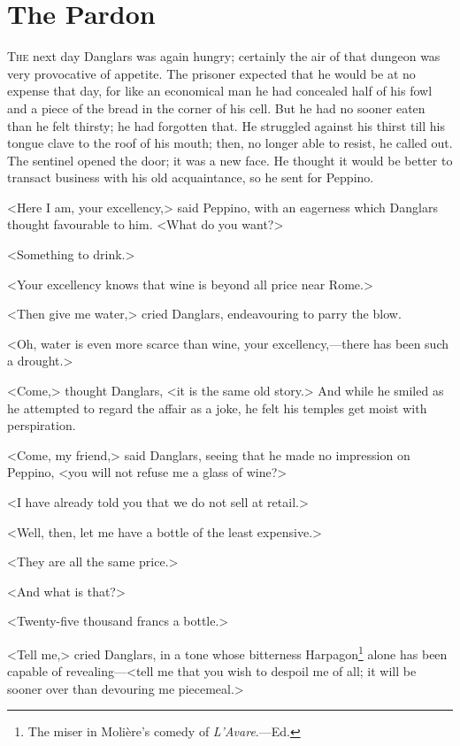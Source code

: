 \chapter{The Pardon} 

 \lettrine{T}{he} next day Danglars was again hungry; certainly the air of that dungeon was very provocative of appetite. The prisoner expected that he would be at no expense that day, for like an economical man he had concealed half of his fowl and a piece of the bread in the corner of his cell. But he had no sooner eaten than he felt thirsty; he had forgotten that. He struggled against his thirst till his tongue clave to the roof of his mouth; then, no longer able to resist, he called out. The sentinel opened the door; it was a new face. He thought it would be better to transact business with his old acquaintance, so he sent for Peppino. 

 <Here I am, your excellency,> said Peppino, with an eagerness which Danglars thought favourable to him. <What do you want?> 

 <Something to drink.> 

 <Your excellency knows that wine is beyond all price near Rome.> 

 <Then give me water,> cried Danglars, endeavouring to parry the blow. 

 <Oh, water is even more scarce than wine, your excellency,—there has been such a drought.> 

 <Come,> thought Danglars, <it is the same old story.> And while he smiled as he attempted to regard the affair as a joke, he felt his temples get moist with perspiration. 

 <Come, my friend,> said Danglars, seeing that he made no impression on Peppino, <you will not refuse me a glass of wine?> 

 <I have already told you that we do not sell at retail.> 

 <Well, then, let me have a bottle of the least expensive.> 

 <They are all the same price.> 

 <And what is that?> 

 <Twenty-five thousand francs a bottle.> 

 <Tell me,> cried Danglars, in a tone whose bitterness Harpagon\footnote{The miser in Molière's comedy of \textit{L'Avare}.—Ed. } alone has been capable of revealing—<tell me that you wish to despoil me of all; it will be sooner over than devouring me piecemeal.> 

